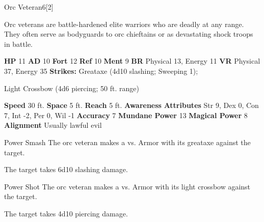   \begin{monsubsection}{Orc Veteran}{6}[2]
    \vspace{-1em}\vspace{-1em}
    \vspace{0em}

    
          Orc veterans are battle-hardened elite warriors who are deadly at any range.
          They often serve as bodyguards to orc chieftains or as devastating shock troops in battle.
        

    \begin{spellcontent}
      \begin{spelltargetinginfo}
        \pari \textbf{HP} 11 \monsep
          \textbf{AD} 10 \monsep
          \textbf{Fort} 12 \monsep
          \textbf{Ref} 10 \monsep
          \textbf{Ment} 9
        \pari \textbf{BR} Physical 13, Energy 11 \monsep
        \textbf{VR} Physical 37, Energy 35
        \pari \textbf{Strikes:}
            Greataxe  (4d10 slashing; Sweeping 1);
\par Light Crossbow  (4d6 piercing; 50 ft. range)
      \end{spelltargetinginfo}
    \end{spellcontent}
    \begin{monsterfooter}
      \pari \textbf{Speed} 30 ft. \monsep
        \textbf{Space} 5 ft. \monsep
        \textbf{Reach} 5 ft.
      \pari \textbf{Awareness} 
      \pari \textbf{Attributes}
        Str 9, Dex 0,
        Con 7, Int -2,
        Per 0, Wil -1
      \pari \textbf{Accuracy} 7 \monsep
        \textbf{Mundane Power} 13 \monsep
      \textbf{Magical Power} 8
      \pari \textbf{Alignment} Usually lawful evil
    \end{monsterfooter}
  \end{monsubsection}
  \begin{freeability}{Power Smash}
       The orc veteran makes a 
         vs. Armor
        with its greataxe against the target.
    
    \hit The target takes 6d10 slashing damage.
    \end{freeability}
  

    \begin{freeability}{Power Shot}
       The orc veteran makes a 
         vs. Armor
        with its light crossbow against the target.
    
    \hit The target takes 4d10 piercing damage.
    \end{freeability}
  

